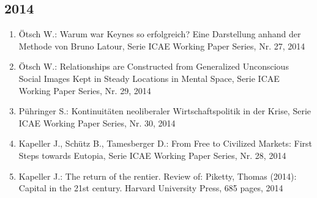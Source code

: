 \subsection*{2014}
\begin{enumerate}
    	 \item Ötsch W.: Warum war Keynes so erfolgreich? Eine Darstellung anhand der Methode von Bruno Latour, Serie ICAE Working Paper Series, Nr. 27, 2014
	 \item Ötsch W.: Relationships are Constructed from Generalized Unconscious Social Images Kept in Steady Locations in Mental Space, Serie ICAE Working Paper Series, Nr. 29, 2014
	 \item Pühringer S.: Kontinuitäten neoliberaler Wirtschaftspolitik in der Krise, Serie ICAE Working Paper Series, Nr. 30, 2014
	 \item Kapeller J., Schütz B., Tamesberger D.: From Free to Civilized Markets: First Steps towards Eutopia, Serie ICAE Working Paper Series, Nr. 28, 2014
	 \item Kapeller J.: The return of the rentier. Review of: Piketty, Thomas (2014): Capital in the 21st century. Harvard University Press, 685 pages, 2014
\end{enumerate}
